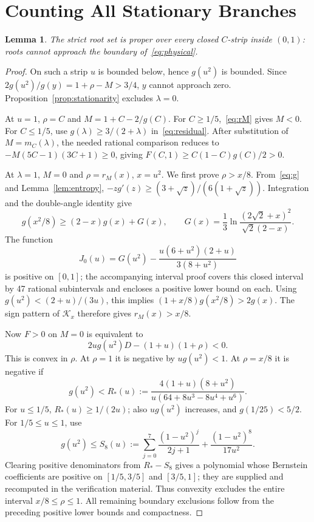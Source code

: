 \documentclass[12pt,letterpaper,onecolumn]{article}
\newtheorem{lemma}[theorem]{Lemma}
\theoremstyle{definition}
\begin{document}
\section{Counting All Stationary Branches}
\begin{lemma}\label{lem:proper}
The strict root set is proper over every closed \(C\)-strip inside \((0,1)\): roots cannot approach the boundary of~\eqref{eq:physical}.
\end{lemma}
\begin{proof}
On such a strip \(u\) is bounded below, hence \(g(u^2)\) is bounded.
Since \(2g(u^2)/g(y)=1+\rho-M>3/4\), \(y\) cannot approach zero.
Proposition~\ref{prop:stationarity} excludes \(\lambda=0\).

At \(u=1\), \(\rho=C\) and \(M=1+C-2/g(C)\).
For \(C\ge1/5\),~\eqref{eq:rM} gives \(M<0\).
For \(C\le1/5\), use \(g(\lambda)\ge3/(2+\lambda)\) in~\eqref{eq:residual}.
After substitution of \(M=m_C(\lambda)\), the needed rational comparison reduces to
\(-M(5C-1)(3C+1)\ge0\), giving
\(F(C,1)\ge C(1-C)g(C)/2>0\).

At \(\lambda=1\), \(M=0\) and \(\rho=r_M(x)\), \(x=u^2\).
We first prove \(\rho>x/8\).
From~\eqref{eq:g} and Lemma~\ref{lem:entropy},
\(-zg'(z)\ge(3+\sqrt z)/(6(1+\sqrt z))\).
Integration and the double-angle identity give
\[
g(x^2/8)\ge(2-x)g(x)+G(x),\qquad
G(x)=\frac13\ln\frac{(2\sqrt2+x)^2}{\sqrt2(2-x)}.
\]
The function
\[
J_0(u)=G(u^2)-\frac{u(6+u^2)(2+u)}{3(8+u^2)}
\]
is positive on \([0,1]\); the accompanying interval proof covers this closed interval by 47 rational subintervals and encloses a positive lower bound on each.
Using \(g(u^2)<(2+u)/(3u)\), this implies
\((1+x/8)g(x^2/8)>2g(x)\).
The sign pattern of \(\mathcal K_x\) therefore gives \(r_M(x)>x/8\).

Now \(F>0\) on \(M=0\) is equivalent to
\[
2u g(u^2)D-(1+u)(1+\rho)<0.
\]
This is convex in \(\rho\). At \(\rho=1\) it is negative by \(ug(u^2)<1\).
At \(\rho=x/8\) it is negative if
\[
g(u^2)<R_*(u):=\frac{4(1+u)(8+u^2)}
{u(64+8u^3-8u^4+u^6)}.
\]
For \(u\le1/5\), \(R_*(u)\ge1/(2u)\); also \(ug(u^2)\) increases, and \(g(1/25)<5/2\).
For \(1/5\le u\le1\), use
\[
g(u^2)\le S_8(u):=\sum_{j=0}^{7}\frac{(1-u^2)^j}{2j+1}
+\frac{(1-u^2)^8}{17u^2}.
\]
Clearing positive denominators from \(R_*-S_8\) gives a polynomial whose Bernstein coefficients are positive on \([1/5,3/5]\) and \([3/5,1]\); they are supplied and recomputed in the verification material.
Thus convexity excludes the entire interval \(x/8\le\rho\le1\).
All remaining boundary exclusions follow from the preceding positive lower bounds and compactness.
\end{proof}
\end{document}
